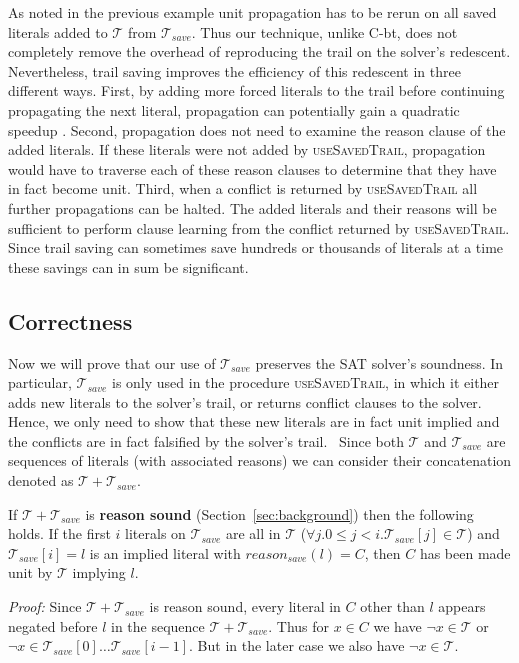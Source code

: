 \documentclass[runningheads]{llncs}
\newcommand{\sat}{SAT\xspace}
\newcommand{\trail}{\ensuremath{\mathcal{T}}}
\newcommand{\reasonsave}[1]{\ensuremath{\mathit{reason_{\mathit{save}}(#1)}}}
\newcommand{\cbt}{C-bt\xspace}
\newcommand{\trailsave}{\trail_{\mathit{save}}}
\newcommand{\ust}{\textsc{useSavedTrail}\xspace}
\newcommand{\whitebox}{\raisebox{.5ex}{\fbox{\hspace*{.2ex}}}}
\begin{document}
As noted in the previous example unit propagation has to be rerun on
all saved literals added to $\trail$ from $\trailsave$. Thus our
technique, unlike \cbt, does not completely remove the overhead of
reproducing the trail on the solver's redescent. Nevertheless, trail
saving improves the efficiency of this redescent in three different
ways. First, by adding more forced literals to the trail before
continuing propagating the next literal, propagation can potentially
gain a quadratic speedup
\cite{DBLP:conf/sat/HickeyB19,DBLP:journals/jair/Gent13}. Second,
propagation does not need to examine the reason clause of the added
literals. If these literals were not added by \ust, propagation would
have to traverse each of these reason clauses to determine that they
have in fact become unit. Third, when a conflict is returned by
\ust all further propagations can be halted. The added literals and
their reasons will be sufficient to perform clause learning from the
conflict returned by \ust. Since trail saving can sometimes save
hundreds or thousands of literals at a time these savings can in sum
be significant.

\subsection{Correctness}
Now we will prove that our use of $\trailsave$ preserves the \sat
solver's soundness. In particular, $\trailsave$ is only used in the
procedure \ust, in which it either adds new literals
to the solver's trail, or returns conflict clauses to the solver.
Hence, we only need to show that these new literals are in fact unit
implied and the conflicts are in fact falsified by the solver's trail.
\
Since both $\trail$ and $\trailsave$ are sequences of literals (with
associated reasons) we can consider their concatenation denoted as
$\trail + \trailsave$.
\begin{theorem}
    \label{thm:sound}
    If $\trail + \trailsave$ is \textbf{reason sound}
    (Section~\ref{sec:background}) then the following holds.  If the
    first $i$ literals on $\trailsave$ are all in $\trail$
    ($\forall j. 0\leq j< i. \trailsave[j]\in \trail$) and
    $\trailsave[i]=l$ is an implied literal with $\reasonsave{l} = C$,
    then $C$ has been made unit by $\trail$ implying $l$.
\end{theorem}
\noindent\emph{Proof:}
Since $\trail + \trailsave$ is reason sound, every literal in $C$
other than $l$ appears negated before $l$ in the sequence
$\trail + \trailsave$. Thus for $x\in C$ we have $\lnot x \in \trail$
or $\lnot x \in \trailsave[0]\ldots\trailsave[i-1]$. But in the later
case we also have $\lnot x \in \trail$. 
\whitebox
\end{document}
